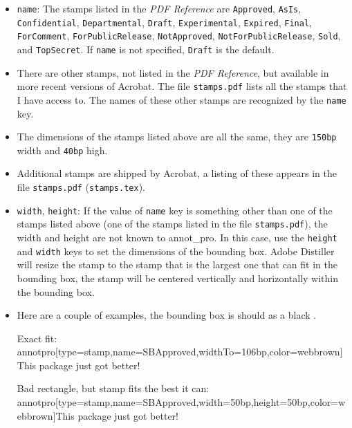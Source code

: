 \documentclass[12pt]{article}
\begin{document}
\begin{itemize}

\begingroup\raggedright

    \item \texttt{name}: The stamps listed in the \textsl{PDF
    Reference} are \texttt{Approved}, \texttt{AsIs},
    \texttt{Confidential}, \texttt{Departmental}, \texttt{Draft},
    \texttt{Experimental}, \texttt{Expired}, \texttt{Final},
    \texttt{ForComment}, \texttt{ForPublicRelease},
    \texttt{NotApproved}, \texttt{NotForPublicRelease},
    \texttt{Sold}, and \texttt{TopSecret}. If \texttt{name}
    is not specified, \texttt{Draft} is the default.\par\endgroup

    \item[] There are other stamps, not listed in the \textsl{PDF
    Reference}, but available in more recent versions of Acrobat.
    The file \texttt{stamps.pdf} lists all the stamps that I have
    access to. The names of these other stamps are recognized by the
    \texttt{name} key.

    \item[] The dimensions of the stamps listed above are all the
    same, they are \texttt{150bp} width and \texttt{40bp} high.

    \item[] Additional stamps are shipped by Acrobat, a listing of these
    appears in the file \texttt{stamps.pdf} (\texttt{stamps.tex}).

    \item\texttt{width}, \texttt{height}: If the value of
    \texttt{name} key is something other than one of the stamps
    listed above (one of the stamps listed in the file
    \texttt{stamps.pdf}), the width and height are not known to
    \textsf{annot\_pro}. In this case, use the \texttt{height} and \texttt{width} keys
    to set the dimensions of the bounding box. Adobe Distiller will
    resize the stamp to the stamp that is the largest one that can fit in
    the bounding box, the stamp will be centered vertically and
    horizontally within the bounding box.

    \item[] Here are a couple of examples, the bounding box is should as a black .

\begin{itemize}

\begin{defineJS}{\annotstampi}
Exact fit:
\\annotpro[type=stamp,name=SBApproved,widthTo=106bp,color=webbrown]{This package just got better!}
\end{defineJS}
\begin{defineJS}{\annotstampii}
Bad rectangle, but stamp fits the best it can:
\\annotpro[type=stamp,name=SBApproved,width=50bp,height=50bp,color=webbrown]{This package just got better!}
\end{defineJS}





\end{itemize}
\end{itemize}
\end{document}
